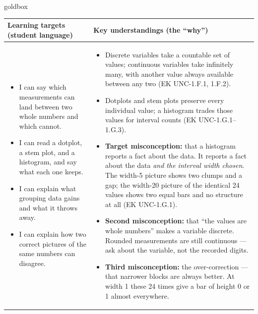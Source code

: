 \documentclass[10pt]{article}
\begin{document}
\renewcommand{\arraystretch}{1.4}
\boxguard
\begin{skillbox}{goldbox}
\begin{tabularx}{\linewidth}{@{}X|X@{}}
\textbf{Learning targets (student language)} & \textbf{Key understandings (the ``why'')} \\[2pt]
\hline
\vspace{-6pt}
\begin{itemize}[leftmargin=1.1em, nosep, after=\vspace{2pt}]
  \item I can say which measurements can land between two whole numbers and which cannot.
  \item I can read a dotplot, a stem plot, and a histogram, and say what each one keeps.
  \item I can explain what grouping data gains and what it throws away.
  \item I can explain how two correct pictures of the same numbers can disagree.
\end{itemize}
&
\vspace{-6pt}
\begin{itemize}[leftmargin=1.1em, nosep, after=\vspace{2pt}]
  \item Discrete variables take a countable set of values; continuous variables take
        infinitely many, with another value always available between any two
        (EK UNC-1.F.1, 1.F.2).
  \item Dotplots and stem plots preserve every individual value; a histogram trades those
        values for interval counts (EK UNC-1.G.1--1.G.3).
  \item \textbf{Target misconception:} that a histogram reports a fact about the data. It
        reports a fact about the data \emph{and the interval width chosen}. The width-5 picture
        shows two clumps and a gap; the width-20 picture of the identical 24 values shows two
        equal bars and no structure at all (EK UNC-1.G.1).
  \item \textbf{Second misconception:} that ``the values are whole numbers'' makes a variable
        discrete. Rounded measurements are still continuous --- ask about the variable, not the
        recorded digits.
  \item \textbf{Third misconception:} the over-correction --- that narrower blocks are always
        better. At width 1 these 24 times give a bar of height 0 or 1 almost everywhere.
\end{itemize}
\end{tabularx}
\end{skillbox}
\end{document}
